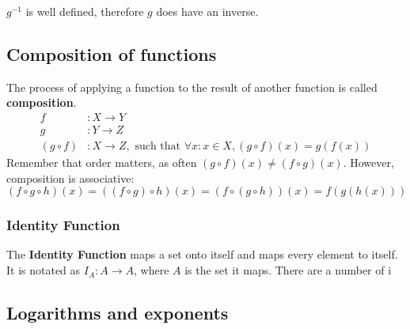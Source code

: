 \begin{center}
  \qquad

  $g^{-1}$ is well defined, therefore $g$ does have an inverse.
\end{center}

\subsection{Composition of functions}

The process of applying a function to the result of another function is called \textbf{composition}.
\begin{align*}
  f           & : X \rightarrow Y                                                                   \\
  g           & : Y \rightarrow Z                                                                   \\
  (g \circ f) & : X \rightarrow Z, \text{ such that } \forall x : x \in X, (g \circ f)(x) = g(f(x))
\end{align*}
Remember that order matters, as often $(g \circ f)(x) \not = (f \circ g)(x)$. However, composition is associative:
\[
  (f \circ g \circ h)(x) = ((f \circ g) \circ h)(x) = (f \circ (g \circ h))(x) = f(g(h(x)))
\]

\subsubsection{Identity Function}

The \textbf{Identity Function} maps a set onto itself and maps every element to itself. It is notated as $I_A: A \rightarrow A$,
where $A$ is the set it maps. There are a number of i

\subsection{Logarithms and exponents}